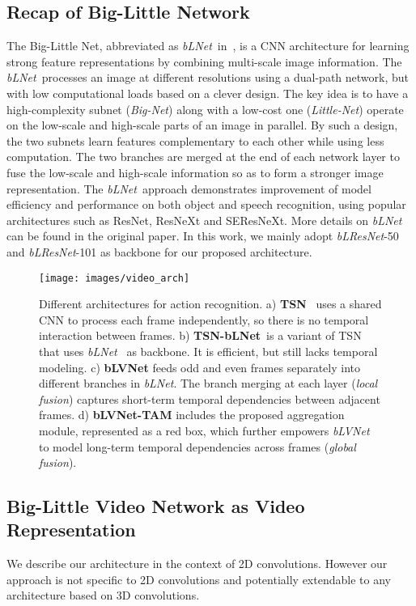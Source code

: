 \documentclass{article}
\def\blnet{\textit{bLNet}\xspace}
\def\blvnetnew{\textit{bLVNet}\xspace}
\def\blresnet{\textit{bLResNet}\xspace}
\begin{document}
\subsection{Recap of Big-Little Network}
\label{sec:approach:blnet}
The Big-Little Net, abbreviated as \blnet~in~\cite{chen2018biglittle}, is a CNN architecture for learning strong feature representations by combining multi-scale image information.
The \blnet~processes an image at different resolutions using a dual-path network, but with low computational loads based on a clever design. The key idea is to have a high-complexity subnet (\textit{Big-Net}) along with a low-cost one (\textit{Little-Net}) operate on the low-scale and high-scale parts of an image in parallel.
By such a design, the two subnets learn features complementary to each other while using less computation. The two branches are merged at the end of each network layer to fuse the low-scale and high-scale information so as to form a stronger image representation.
The \blnet~approach demonstrates improvement of model efficiency and performance on both object and speech recognition, using popular architectures such as ResNet, ResNeXt and SEResNeXt. More details on \blnet can be found in the original paper. In this work, we mainly adopt \blresnet-50 and \blresnet-101 as backbone for our proposed architecture.

\begin{figure}[b!] 
\centering
\texttt{[image: images/video\_arch]}
\caption{\label{fig:video_arch} Different architectures for action recognition. a) \textbf{TSN}~\cite{TSN:wang2016temporal} uses a shared CNN to process each frame independently, so there is no temporal interaction between frames. b) \textbf{TSN-bLNet}~is a variant of TSN that uses \blnet~\cite{chen2018biglittle} as backbone. It is efficient, but still lacks temporal modeling. c) \textbf{bLVNet} feeds odd and even frames separately into different branches in \blnet. The branch merging at each layer (\textit{local fusion}) captures short-term temporal dependencies between adjacent frames. d) \textbf{bLVNet-TAM} includes the proposed aggregation module, represented as a red box, which further empowers \blvnetnew to model long-term temporal dependencies across frames (\textit{global fusion}).} 
\end{figure}

\subsection{Big-Little Video Network as Video Representation}
\label{sec:approach:dpn}
We describe our architecture in the context of 2D convolutions. However our approach is not specific to 2D convolutions and potentially extendable to any architecture based on 3D convolutions.
\end{document}
